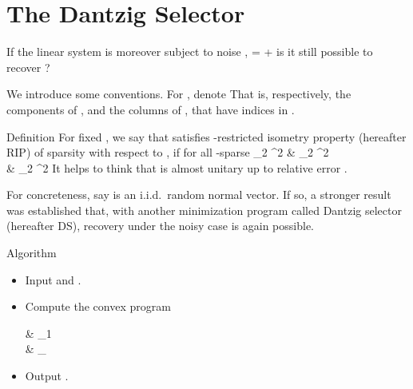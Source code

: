 \section {The Dantzig Selector}

If the linear system is moreover subject to noise ,
%
 {
=  +  
}
is it still possible to recover ?

We introduce some conventions.
For , denote
%
%
That is, respectively, the components of , and the columns of , that have indices in .

\Result
{Definition}
{
For fixed , we say that  satisfies -restricted isometry property (hereafter  RIP) of sparsity  with respect to , if for all -sparse 
%
 {
  _2 ^2
\leq & _2 ^2 \notag \\
%
\leq &  _2 ^2 
}
}
%
It helps to think that  is almost unitary up to relative error .

For concreteness, say  is an i.i.d.\ random normal vector.
If so, a stronger result was established that, with another  minimization program called Dantzig selector (hereafter DS), recovery under the noisy case is again possible.

\Result
{Algorithm}
{
\begin {itemize}
\item Input  and .
%
\item Compute the convex program
%
 {
\leftarrow \begin {cases}
 &  _1 \\
%
 \;  \quad &  _\infty \leq \g \\
\end {cases} 
}
\item Output .
\end {itemize}
}


